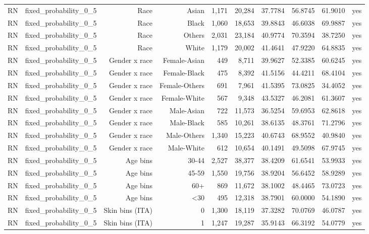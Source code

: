 \documentclass[10pt]{article}
\begin{document}
\begin{longtable}{@{}lrrrrrrrrr@{}}
RN & fixed\_probability\_0\_5 & Race & Asian & 1,171 & 20,284 & 37.7784 & 56.8745 & 61.9010 & yes \\
RN & fixed\_probability\_0\_5 & Race & Black & 1,060 & 18,653 & 39.8843 & 46.6038 & 69.9887 & yes \\
RN & fixed\_probability\_0\_5 & Race & Others & 2,031 & 23,184 & 40.9774 & 70.3594 & 38.7250 & yes \\
RN & fixed\_probability\_0\_5 & Race & White & 1,179 & 20,002 & 41.4641 & 47.9220 & 64.8835 & yes \\
RN & fixed\_probability\_0\_5 & Gender x race & Female-Asian & 449 & 8,711 & 39.9627 & 52.3385 & 60.6245 & yes \\
RN & fixed\_probability\_0\_5 & Gender x race & Female-Black & 475 & 8,392 & 41.5156 & 44.4211 & 68.4104 & yes \\
RN & fixed\_probability\_0\_5 & Gender x race & Female-Others & 691 & 7,961 & 41.5395 & 73.0825 & 34.4052 & yes \\
RN & fixed\_probability\_0\_5 & Gender x race & Female-White & 567 & 9,348 & 43.5327 & 46.2081 & 61.3607 & yes \\
RN & fixed\_probability\_0\_5 & Gender x race & Male-Asian & 722 & 11,573 & 36.5254 & 59.6953 & 62.8618 & yes \\
RN & fixed\_probability\_0\_5 & Gender x race & Male-Black & 585 & 10,261 & 38.6135 & 48.3761 & 71.2796 & yes \\
RN & fixed\_probability\_0\_5 & Gender x race & Male-Others & 1,340 & 15,223 & 40.6743 & 68.9552 & 40.9840 & yes \\
RN & fixed\_probability\_0\_5 & Gender x race & Male-White & 612 & 10,654 & 40.1491 & 49.5098 & 67.9745 & yes \\
RN & fixed\_probability\_0\_5 & Age bins & 30-44 & 2,527 & 38,377 & 38.4209 & 61.6541 & 53.9933 & yes \\
RN & fixed\_probability\_0\_5 & Age bins & 45-59 & 1,550 & 19,756 & 38.9204 & 56.6452 & 58.9289 & yes \\
RN & fixed\_probability\_0\_5 & Age bins & 60+ & 869 & 11,672 & 38.1002 & 48.4465 & 73.0723 & yes \\
RN & fixed\_probability\_0\_5 & Age bins & \textless{}30 & 495 & 12,318 & 38.7901 & 60.0000 & 54.1890 & yes \\
RN & fixed\_probability\_0\_5 & Skin bins (ITA) & 0 & 1,300 & 18,119 & 37.3282 & 70.0769 & 46.0787 & yes \\
RN & fixed\_probability\_0\_5 & Skin bins (ITA) & 1 & 1,247 & 19,287 & 35.9143 & 66.3192 & 54.0779 & yes \\

\end{longtable}
\end{document}
